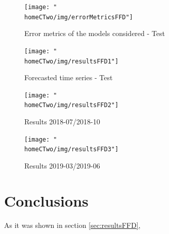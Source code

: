 \documentclass[a4paper]{article}
\newcommand{\homeCTwo}{../../Chapter 2 - FracDiff/Draft}
\begin{document}
\begin{figure}[htbp]
	\centering
	\begin{minipage}{.5\textwidth}
  		\centering
		\texttt{[image: "\\homeCTwo/img/errorMetricsFFD"]}
		\caption{Error metrics of the models considered - Test}
		\label{fig:MetricsFFD}
	\end{minipage}%
	\begin{minipage}{.5\textwidth}
  		\centering
		\texttt{[image: "\\homeCTwo/img/resultsFFD1"]}
		\caption{Forecasted time series - Test}
		\label{fig:resultsFFD1}
	\end{minipage}
\end{figure}


\begin{figure}[htbp]
	\centering
	\begin{minipage}{.5\textwidth}
  		\centering
  		\texttt{[image: "\\homeCTwo/img/resultsFFD2"]}
  		\caption{Results 2018-07/2018-10}
  		\label{fig:resultsFFD2}
	\end{minipage}%
	\begin{minipage}{.5\textwidth}
  		\centering
  		\texttt{[image: "\\homeCTwo/img/resultsFFD3"]}
  		\caption{Results 2019-03/2019-06}
  		\label{fig:resultsFFD3}
	\end{minipage}
\end{figure}

\section{Conclusions}
As it was shown in section \ref{sec:resultsFFD}, 


\end{document}
